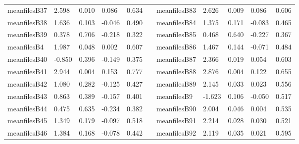 \begin{table}[h!]
\begin{tabular}{lllllllllll}
meanfilesB37  & 2.598            & 0.010            & 0.086               & 0.634               &           & meanfilesB83  & 2.626            & 0.009            & 0.086               & 0.606               \\
meanfilesB38  & 1.636            & 0.103            & -0.046              & 0.490               &           & meanfilesB84  & 1.375            & 0.171            & -0.083              & 0.465               \\
meanfilesB39  & 0.378            & 0.706            & -0.218              & 0.322               &           & meanfilesB85  & 0.468            & 0.640            & -0.227              & 0.367               \\
meanfilesB4   & 1.987            & 0.048            & 0.002               & 0.607               &           & meanfilesB86  & 1.467            & 0.144            & -0.071              & 0.484               \\
meanfilesB40  & -0.850           & 0.396            & -0.149              & 0.375               &           & meanfilesB87  & 2.366            & 0.019            & 0.054               & 0.603               \\
meanfilesB41  & 2.944            & 0.004            & 0.153               & 0.777               &           & meanfilesB88  & 2.876            & 0.004            & 0.122               & 0.655               \\
meanfilesB42  & 1.080            & 0.282            & -0.125              & 0.427               &           & meanfilesB89  & 2.145            & 0.033            & 0.023               & 0.556               \\
meanfilesB43  & 0.863            & 0.389            & -0.157              & 0.401               &           & meanfilesB9   & -1.623           & 0.106            & -0.050              & 0.517               \\
meanfilesB44  & 0.475            & 0.635            & -0.234              & 0.382               &           & meanfilesB90  & 2.004            & 0.046            & 0.004               & 0.535               \\
meanfilesB45  & 1.349            & 0.179            & -0.097              & 0.518               &           & meanfilesB91  & 2.214            & 0.028            & 0.030               & 0.521               \\
meanfilesB46  & 1.384            & 0.168            & -0.078              & 0.442               &           & meanfilesB92  & 2.119            & 0.035            & 0.021               & 0.595               \\

\end{tabular}
\end{table}
